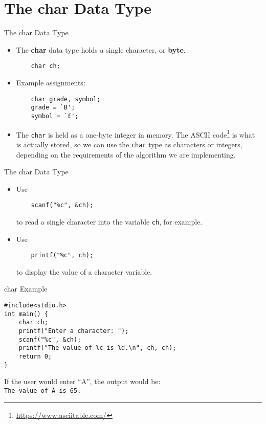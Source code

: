 \documentclass[graphics]{beamer}
\begin{document}
\section{The char Data Type}
\begin{frame}[fragile]{The char Data Type}
    \begin{itemize}
        \item The \textbf{char} data type holds a single character, or \textbf{byte}.
        \begin{verbatim}
    char ch;
        \end{verbatim}
        \item Example assignments:
        \begin{verbatim}
    char grade, symbol;
    grade = `B';
    symbol = `£';
        \end{verbatim}
        \item The \texttt{char} is held as a one-byte integer in memory. The ASCII code\footnote{\url{https://www.asciitable.com/}} is what is actually stored, so we can use the \texttt{char} type as characters or integers, depending on the requirements of the algorithm we are implementing.
    \end{itemize}
\end{frame}

\begin{frame}[fragile]{The char Data Type}
    \begin{itemize}
        \item Use
        \begin{verbatim}
    scanf("%c", &ch);
        \end{verbatim}
        to read a single character into the variable \texttt{ch}, for example.
        \item Use
        \begin{verbatim}
    printf("%c", ch);
        \end{verbatim}
        to display the value of a character variable.
    \end{itemize}
\end{frame}

\begin{frame}[fragile]{char Example}
    \begin{verbatim}
#include<stdio.h>
int main() {
    char ch;
    printf("Enter a character: ");
    scanf("%c", &ch);
    printf("The value of %c is %d.\n", ch, ch);
    return 0;
}
    \end{verbatim}
    If the user would enter ``A'', the output would be: \\
    \texttt{The value of A is 65.}
\end{frame}
\end{document}
